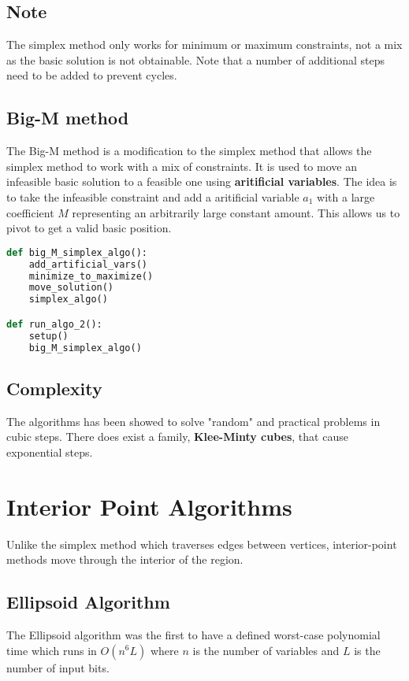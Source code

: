 \documentclass{article}
\begin{document}
\subsection{Note}
The simplex method only works for minimum or maximum constraints, not a mix as the basic solution is not obtainable.
Note that a number of additional steps need to be added to prevent cycles.

\subsection{Big-M method}
The Big-M method is a modification to the simplex method that allows the simplex method to work with a mix of constraints.
It is used to move an infeasible basic solution to a feasible one using \textbf{aritificial variables}. The idea is to take
the infeasible constraint and add a aritificial variable $a_{1}$ with a large coefficient $M$ representing an
arbitrarily large constant amount. This allows us to pivot to get a valid basic position.

\begin{lstlisting}[language=Python]
def big_M_simplex_algo():
    add_artificial_vars()
    minimize_to_maximize()
    move_solution()
    simplex_algo()

def run_algo_2():
    setup()
    big_M_simplex_algo()

\end{lstlisting}

\subsection{Complexity}
The algorithms has been showed to solve "random" and practical problems in cubic steps.
There does exist a family, \textbf{Klee-Minty cubes}, that cause exponential steps. 

\section{Interior Point Algorithms}
Unlike the simplex method which traverses edges between vertices, interior-point methods
move through the interior of the region.
\subsection{Ellipsoid Algorithm}
The Ellipsoid algorithm was the first to have a defined worst-case polynomial time which runs in $O(n^{6}L)$
where $n$ is the number of variables and $L$ is the number of input bits.
\end{document}
